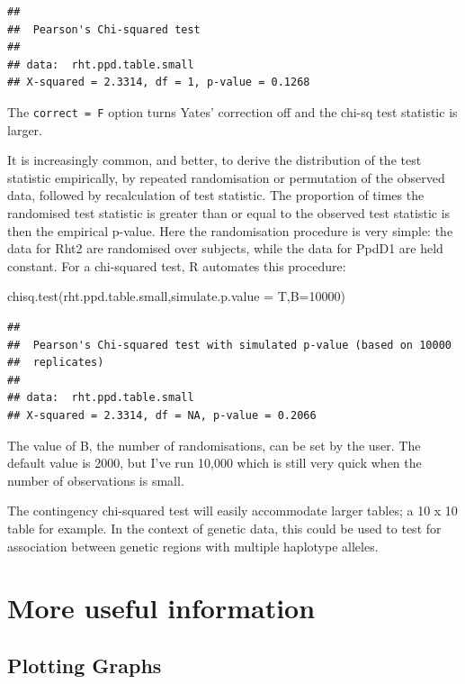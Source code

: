 \documentclass[
]{book}
\newenvironment{Shaded}{\begin{snugshade}}{\end{snugshade}}
\newcommand{\AttributeTok}[1]{\textcolor[rgb]{0.77,0.63,0.00}{#1}}
\newcommand{\DecValTok}[1]{\textcolor[rgb]{0.00,0.00,0.81}{#1}}
\newcommand{\FunctionTok}[1]{\textcolor[rgb]{0.00,0.00,0.00}{#1}}
\newcommand{\NormalTok}[1]{#1}
\begin{document}
\begin{verbatim}
## 
##  Pearson's Chi-squared test
## 
## data:  rht.ppd.table.small
## X-squared = 2.3314, df = 1, p-value = 0.1268
\end{verbatim}

The \texttt{correct\ =\ F} option turns Yates' correction off and the chi-sq test statistic is larger.

It is increasingly common, and better, to derive the distribution of the test statistic empirically, by repeated randomisation or permutation of the observed data, followed by recalculation of test statistic. The proportion of times the randomised test statistic is greater than or equal to the observed test statistic is then the empirical p-value. Here the randomisation procedure is very simple: the data for Rht2 are randomised over subjects, while the data for PpdD1 are held constant. For a chi-squared test, R automates this procedure:

\begin{Shaded}
\begin{Highlighting}[]
\FunctionTok{chisq.test}\NormalTok{(rht.ppd.table.small,}\AttributeTok{simulate.p.value =}\NormalTok{ T,}\AttributeTok{B=}\DecValTok{10000}\NormalTok{)}
\end{Highlighting}
\end{Shaded}

\begin{verbatim}
## 
##  Pearson's Chi-squared test with simulated p-value (based on 10000
##  replicates)
## 
## data:  rht.ppd.table.small
## X-squared = 2.3314, df = NA, p-value = 0.2066
\end{verbatim}

The value of B, the number of randomisations, can be set by the user. The default value is 2000, but I've run 10,000 which is still very quick when the number of observations is small.

The contingency chi-squared test will easily accommodate larger tables; a 10 x 10 table for example. In the context of genetic data, this could be used to test for association between genetic regions with multiple haplotype alleles.

\hypertarget{more-useful-information}{%
\section{More useful information}\label{more-useful-information}}

\hypertarget{plotting-graphs}{%
\subsection{Plotting Graphs}\label{plotting-graphs}}
\end{document}
